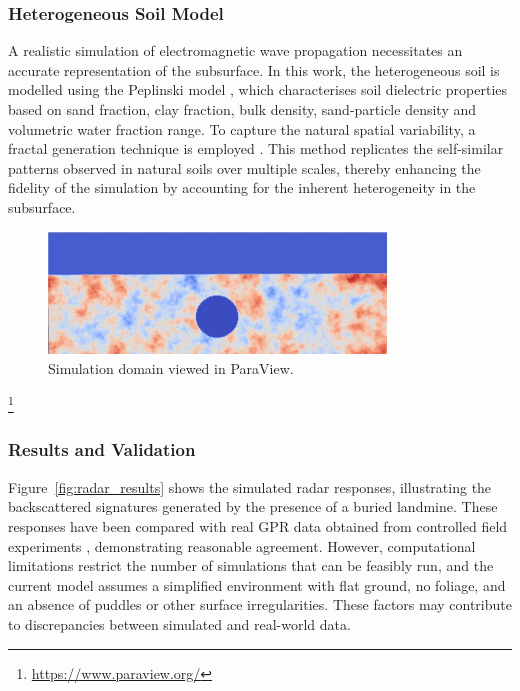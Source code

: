     \subsubsection{Heterogeneous Soil Model}
    
        A realistic simulation of electromagnetic wave propagation necessitates an accurate representation of the subsurface. In this work, the heterogeneous soil is modelled using the Peplinski model \cite{dummyRef4}, which characterises soil dielectric properties based on sand fraction, clay fraction, bulk density, sand-particle density and volumetric water fraction range. To capture the natural spatial variability, a fractal generation technique is employed \cite{dummyRef5}. This method replicates the self-similar patterns observed in natural soils over multiple scales, thereby enhancing the fidelity of the simulation by accounting for the inherent heterogeneity in the subsurface.
    


    
        \begin{figure}[htbp]
            \centering
            \includegraphics[width=0.8\textwidth]{figs/Rory/radar_domain.pdf}
            \caption{Simulation domain viewed in ParaView.}
            \label{fig:radar_domain}
        \end{figure}
        \footnote{\url{https://www.paraview.org/}}
    
    
    
    
    \subsubsection{Results and Validation}
    
        Figure~\ref{fig:radar_results} shows the simulated radar responses, illustrating the backscattered signatures generated by the presence of a buried landmine. These responses have been compared with real GPR data obtained from controlled field experiments \cite{dummyRef7}, demonstrating reasonable agreement. However, computational limitations restrict the number of simulations that can be feasibly run, and the current model assumes a simplified environment with flat ground, no foliage, and an absence of puddles or other surface irregularities. These factors may contribute to discrepancies between simulated and real-world data.
    
